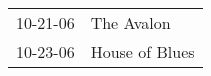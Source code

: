 \begin{supertabular}{p{0.25\columnwidth}p{0.75\columnwidth}}
 10-21-06 &      The Avalon \\
 10-23-06 &  House of Blues \\
\end{supertabular}
